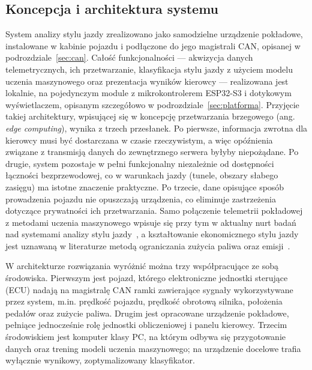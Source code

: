 \subsection{Koncepcja i architektura systemu}
\label{sec:architektura}

System analizy stylu jazdy zrealizowano jako samodzielne urządzenie pokładowe,
instalowane w kabinie pojazdu i podłączone do jego magistrali CAN, opisanej
w podrozdziale~\ref{sec:can}. Całość funkcjonalności ---
akwizycja danych telemetrycznych, ich przetwarzanie, klasyfikacja stylu jazdy
z użyciem modelu uczenia maszynowego oraz prezentacja wyników kierowcy ---
realizowana jest lokalnie, na pojedynczym module z mikrokontrolerem ESP32-S3
i dotykowym wyświetlaczem, opisanym szczegółowo w podrozdziale~\ref{sec:platforma}.
Przyjęcie takiej architektury, wpisującej się w koncepcję przetwarzania
brzegowego (ang. \emph{edge computing}), wynika z trzech przesłanek. Po
pierwsze, informacja zwrotna dla kierowcy musi być dostarczana w czasie
rzeczywistym, a więc opóźnienia związane z transmisją danych do zewnętrznego
serwera byłyby niepożądane. Po drugie, system pozostaje w pełni funkcjonalny
niezależnie od dostępności łączności bezprzewodowej, co w warunkach jazdy
(tunele, obszary słabego zasięgu) ma istotne znaczenie praktyczne. Po trzecie,
dane opisujące sposób prowadzenia pojazdu nie opuszczają urządzenia, co
eliminuje zastrzeżenia dotyczące prywatności ich przetwarzania. Samo połączenie
telemetrii pokładowej z metodami uczenia maszynowego wpisuje się przy tym
w aktualny nurt badań nad systemami analizy stylu jazdy~\cite{meiring2015},
a kształtowanie ekonomicznego stylu jazdy jest uznawaną w literaturze metodą
ograniczania zużycia paliwa oraz emisji~\cite{barkenbus2010}.

W architekturze rozwiązania wyróżnić można trzy współpracujące ze sobą
środowiska. Pierwszym jest pojazd, którego elektroniczne jednostki sterujące
(ECU) nadają na magistralę CAN ramki
zawierające sygnały wykorzystywane przez system, m.in. prędkość pojazdu,
prędkość obrotową silnika, położenia pedałów oraz zużycie paliwa. Drugim jest
opracowane urządzenie pokładowe, pełniące jednocześnie rolę jednostki
obliczeniowej i panelu kierowcy. Trzecim środowiskiem jest komputer klasy PC,
na którym odbywa się przygotowanie danych oraz trening
modeli uczenia maszynowego; na urządzenie docelowe trafia wyłącznie wynikowy,
zoptymalizowany klasyfikator.

